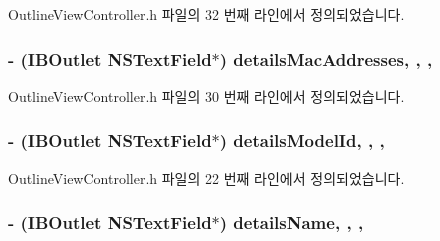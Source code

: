 Outline\+View\+Controller.\+h 파일의 32 번째 라인에서 정의되었습니다.

\subsubsection[{\texorpdfstring{details\+Mac\+Addresses}{detailsMacAddresses}}]{\setlength{\rightskip}{0pt plus 5cm}-\/ (I\+B\+Outlet N\+S\+Text\+Field$\ast$) details\+Mac\+Addresses\hspace{0.3cm}{\ttfamily [read]}, {\ttfamily [write]}, {\ttfamily [atomic]}, {\ttfamily [weak]}}\hypertarget{interface_outline_view_controller_a19f74cf027687add4d1e4c15268ceffe}{}\label{interface_outline_view_controller_a19f74cf027687add4d1e4c15268ceffe}


Outline\+View\+Controller.\+h 파일의 30 번째 라인에서 정의되었습니다.

\subsubsection[{\texorpdfstring{details\+Model\+Id}{detailsModelId}}]{\setlength{\rightskip}{0pt plus 5cm}-\/ (I\+B\+Outlet N\+S\+Text\+Field$\ast$) details\+Model\+Id\hspace{0.3cm}{\ttfamily [read]}, {\ttfamily [write]}, {\ttfamily [atomic]}, {\ttfamily [weak]}}\hypertarget{interface_outline_view_controller_a0d0fd477fde079e7e594bd8576ba10fd}{}\label{interface_outline_view_controller_a0d0fd477fde079e7e594bd8576ba10fd}


Outline\+View\+Controller.\+h 파일의 22 번째 라인에서 정의되었습니다.

\subsubsection[{\texorpdfstring{details\+Name}{detailsName}}]{\setlength{\rightskip}{0pt plus 5cm}-\/ (I\+B\+Outlet N\+S\+Text\+Field$\ast$) details\+Name\hspace{0.3cm}{\ttfamily [read]}, {\ttfamily [write]}, {\ttfamily [atomic]}, {\ttfamily [weak]}}\hypertarget{interface_outline_view_controller_a7a9756ea9cb4e3a8b300d1906e020ec3}{}\label{interface_outline_view_controller_a7a9756ea9cb4e3a8b300d1906e020ec3}



